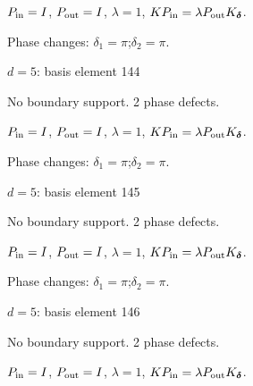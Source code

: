 \vspace{-1mm}
$P_{\rm in}=I$, \quad $P_{\rm out}=I$, \quad $\lambda=1$, \qquad $K P_{\rm in}=\lambda P_{\rm out}K_{\boldsymbol\delta}$.
\par\smallskip\begin{minipage}{.98\linewidth}\small Phase changes: $\delta_{1}=\pi$;\quad $\delta_{2}=\pi$.\end{minipage}
\vfill
{\footnotesize\texttt{}}
\newpage
{}
{\Large $d=5$: basis element 144}\par
No boundary support. 2 phase defects.
\begin{center}
\end{center}
\vspace{-1mm}
$P_{\rm in}=I$, \quad $P_{\rm out}=I$, \quad $\lambda=1$, \qquad $K P_{\rm in}=\lambda P_{\rm out}K_{\boldsymbol\delta}$.
\par\smallskip\begin{minipage}{.98\linewidth}\small Phase changes: $\delta_{1}=\pi$;\quad $\delta_{2}=\pi$.\end{minipage}
\vfill
{\footnotesize\texttt{}}
\newpage
{}
{\Large $d=5$: basis element 145}\par
No boundary support. 2 phase defects.
\begin{center}
\end{center}
\vspace{-1mm}
$P_{\rm in}=I$, \quad $P_{\rm out}=I$, \quad $\lambda=1$, \qquad $K P_{\rm in}=\lambda P_{\rm out}K_{\boldsymbol\delta}$.
\par\smallskip\begin{minipage}{.98\linewidth}\small Phase changes: $\delta_{1}=\pi$;\quad $\delta_{2}=\pi$.\end{minipage}
\vfill
{\footnotesize\texttt{}}
\newpage
{}
{\Large $d=5$: basis element 146}\par
No boundary support. 2 phase defects.
\begin{center}
\end{center}
\vspace{-1mm}
$P_{\rm in}=I$, \quad $P_{\rm out}=I$, \quad $\lambda=1$, \qquad $K P_{\rm in}=\lambda P_{\rm out}K_{\boldsymbol\delta}$.
